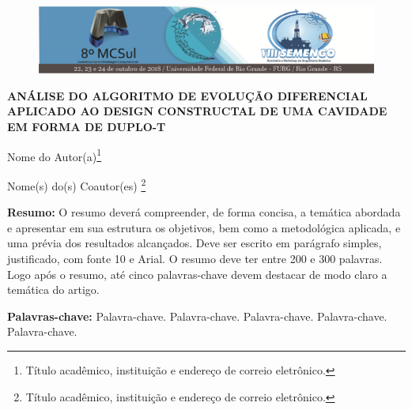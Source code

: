 \documentclass[12pt,A4,A4pt]{article}
\begin{document}


\begin{figure}
\centering
\vspace{-1cm}
\begin{minipage}[c]{\textwidth}
\centering
    \includegraphics[width=6.2in]{cabecalho.eps}
\end{minipage}
\end{figure}



\begin{center}
\fontsize{16pt}{\baselineskip}\selectfont 
\textbf{{ANÁLISE DO ALGORITMO DE EVOLUÇÃO DIFERENCIAL APLICADO AO DESIGN CONSTRUCTAL DE UMA CAVIDADE EM FORMA DE DUPLO-T}}
\end{center}
\vspace{-0.9cm}

\begin{flushright}
Nome do Autor(a)\footnote{Título acadêmico, instituição e endereço de correio eletrônico.}

Nome(s) do(s) Coautor(es)  \footnote{Título acadêmico, instituição e endereço de correio eletrônico.}

\end{flushright}

\begin{flushleft}
{\small {} \justify
\textbf{Resumo:} O resumo deverá compreender, de forma concisa, a temática abordada e apresentar em sua estrutura os objetivos, bem como a metodológica aplicada, e uma prévia dos resultados alcançados. Deve ser escrito em parágrafo simples, justificado, com fonte 10 e Arial. O resumo deve ter entre 200 e 300 palavras. Logo após o resumo, até cinco palavras-chave devem destacar de modo claro a temática do artigo.

\vspace{0.3cm}

\noindent\textbf{Palavras-chave:} Palavra-chave. Palavra-chave. Palavra-chave. Palavra-chave. Palavra-chave.}
\end{flushleft}
\end{document}
